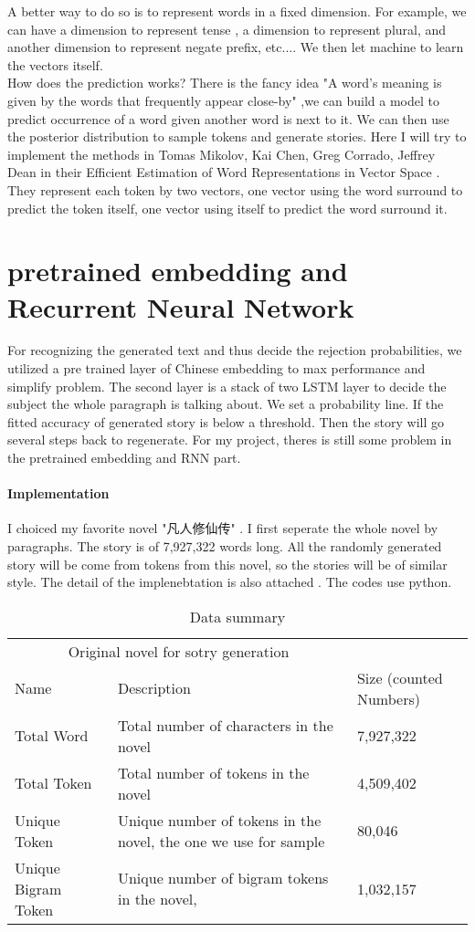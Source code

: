 \documentclass{article}
\begin{document}
A better way to do so is to represent words in a fixed dimension. For example, we can have a dimension to represent tense , a dimension to represent plural, 
and another dimension to represent negate prefix, etc....  We then let machine to learn the vectors itself.
$$$$
How does the prediction works? There is the fancy idea "A word’s meaning is given by the words that frequently appear close-by" ,we can build a model to predict occurrence of a word given another word is next to it. We can then use the posterior distribution to sample tokens and generate stories.  Here I will try to implement the methods in Tomas Mikolov, Kai Chen, Greg Corrado, Jeffrey Dean in their Efficient Estimation of Word Representations in Vector Space \cite {word2vec}. They represent each token by two vectors, one vector using the word surround to predict the token itself, one vector using itself to predict the word surround it.

\section{pretrained embedding and Recurrent Neural Network}
For recognizing the generated text and thus decide the rejection probabilities, we utilized a pre trained layer of Chinese embedding to max performance and simplify problem. The second layer is a stack of two LSTM layer to decide the subject the whole paragraph is talking about. We set a probability line. If the fitted accuracy of generated story is below a threshold. Then the story will go several steps back to regenerate. For my project, theres is still some problem in the pretrained embedding and RNN part. 


\paragraph{Implementation}
I choiced my favorite novel "凡人修仙传" . I first seperate the whole novel by paragraphs. The story is of 7,927,322 words long. All the randomly generated story will be come from tokens from this novel, so the stories will be of similar style. 
The detail of the implenebtation is also attached . The codes use python. 


\begin{table}
 \caption{Data summary}
  \centering
  \begin{tabular}{lll}
    \toprule
    \multicolumn{2}{c}{Original novel for sotry generation}                   \\
    \cmidrule(r){1-2}
    Name     & Description     & Size (counted Numbers) \\
    \midrule
    Total Word     &Total number of characters in the novel&  7,927,322     \\
    Total Token     &Total number of tokens in the novel &  4,509,402    \\
    Unique Token     & Unique number of tokens in the novel, the one we use for sample&  80,046 \\ 
    Unique Bigram Token     & Unique number of bigram tokens in the novel,& 1,032,157 \\ 
    \bottomrule
  \end{tabular}
  \label{tab:table}
\end{table}
\end{document}
